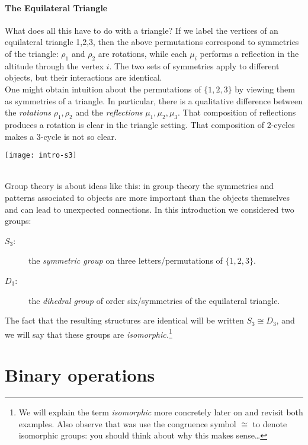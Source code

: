 \begin{minipage}{0.6\textwidth}
\paragraph{The Equilateral Triangle}
What does all this have to do with a triangle? If we label the vertices of an equilateral triangle 1,2,3, then the above permutations correspond to symmetries of the triangle: $\rho_1$ and $\rho_2$ are rotations, while each $\mu_i$ performs a reflection in the altitude through the vertex $i$. The two sets of symmetries apply to different objects, but their interactions are identical.\\

One might obtain intuition about the permutations of $\{1,2,3\}$ by viewing them as symmetries of a triangle. In particular, there is a qualitative difference between the \emph{rotations} $\rho_1,\rho_2$ and the \emph{reflections} $\mu_1,\mu_2,\mu_3$. That composition of reflections produces a rotation is clear in the triangle setting. That composition of 2-cycles makes a 3-cycle is not so clear.
\end{minipage}\begin{minipage}{0.4\textwidth}
\flushright\texttt{[image: intro-s3]}
\end{minipage}\\[8pt]


Group theory is about ideas like this: in group theory the symmetries and patterns associated to objects are more important than the objects themselves and can lead to unexpected connections. In this introduction we considered two groups:
\begin{description}
	\item[$S_3$:] the \emph{symmetric group} on three letters/permutations of $\{1,2,3\}$.
	\item[$D_3$:] the \emph{dihedral group} of order six/symmetries of the equilateral triangle.
\end{description}
The fact that the resulting structures are identical will be written $S_3\cong D_3$, and we will say that these groups are \emph{isomorphic.}\footnote{We will explain the term \emph{isomorphic} more concretely later on and revisit both examples. Also observe that was use the congruence symbol $\cong$ to denote isomorphic groups: you should think about why this makes sense\ldots} 


\section{Binary operations}\hypertarget{sec:binary}{}

